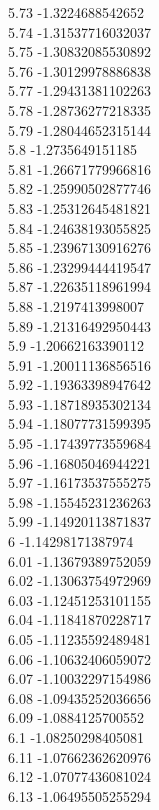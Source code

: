 {5.73	-1.3224688542652\\
5.74	-1.31537716032037\\
5.75	-1.30832085530892\\
5.76	-1.30129978886838\\
5.77	-1.29431381102263\\
5.78	-1.28736277218335\\
5.79	-1.28044652315144\\
5.8	-1.2735649151185\\
5.81	-1.26671779966816\\
5.82	-1.25990502877746\\
5.83	-1.25312645481821\\
5.84	-1.24638193055825\\
5.85	-1.23967130916276\\
5.86	-1.23299444419547\\
5.87	-1.22635118961994\\
5.88	-1.2197413998007\\
5.89	-1.21316492950443\\
5.9	-1.20662163390112\\
5.91	-1.20011136856516\\
5.92	-1.19363398947642\\
5.93	-1.18718935302134\\
5.94	-1.18077731599395\\
5.95	-1.17439773559684\\
5.96	-1.16805046944221\\
5.97	-1.16173537555275\\
5.98	-1.15545231236263\\
5.99	-1.14920113871837\\
6	-1.14298171387974\\
6.01	-1.13679389752059\\
6.02	-1.13063754972969\\
6.03	-1.12451253101155\\
6.04	-1.11841870228717\\
6.05	-1.11235592489481\\
6.06	-1.10632406059072\\
6.07	-1.10032297154986\\
6.08	-1.09435252036656\\
6.09	-1.0884125700552\\
6.1	-1.08250298405081\\
6.11	-1.07662362620976\\
6.12	-1.07077436081024\\
6.13	-1.06495505255294\\
}

